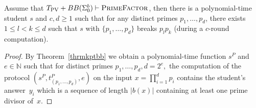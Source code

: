 \documentclass{lmcs}
\newcommand{\PV}{\text{PV}}
\newcommand{\abs}[1]{\lvert #1\rvert}
\newcommand{\PrimeFactor}{\textsc{PrimeFactor}}
\newcommand{\NN}{\mathbb{N}}
\begin{document}
\begin{lem}\label{lemmconversion}
    Assume that $T_{\PV}+ BB(\Sigma^b_0) \vdash \PrimeFactor$, then there is a polynomial-time student $s$ and $c,d\geq 1$ such that for any distinct primes $p_1,\dots,p_d$, there exists $1\leq l < k \leq d$ such that $s$ with $\{p_1,\dots,p_d\}$ breaks $p_lp_k$ (during a $c$-round computation).
\end{lem}
\begin{proof}
    By Theorem~\ref{thrmkptbb} we obtain a polynomial-time function $s^P$ and ${{e}\in \NN}$ such that for distinct primes $p_1,\dots, p_d, d=2^{{e}},$ the computation of the protocol $(s^P,t^P_{(p_1,\dots,p_d)},{e})$ on the input $x=\prod_{i=1}^d p_i$ contains the student's answer~$y_i$ which is a sequence of length $\abs{b(x)}$ containing at least one prime divisor of~$x$.


\end{proof}
\end{document}
